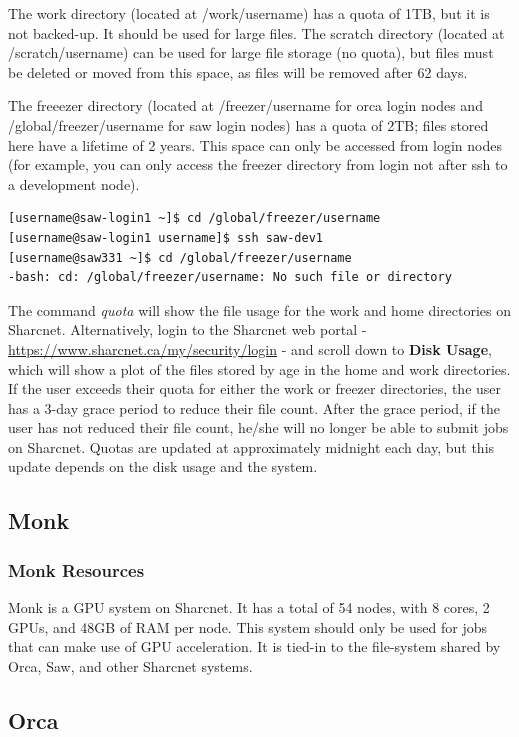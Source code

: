 \documentclass[12pt]{article}
\begin{document}
\quad The work directory (located at /work/username) has a quota of 1TB, but it is not backed-up. It should be used for large files. The scratch directory (located at /scratch/username) can be used for large file storage (no quota), but files must be deleted or moved from this space, as files will be removed after 62 days. 

\quad The freeezer directory (located at /freezer/username for orca login nodes and /global/freezer/username for saw login nodes) has a quota of 2TB; files stored here have a lifetime of 2 years. This space can only be accessed from login nodes (for example, you can only access the freezer directory from login not after ssh to a development node).

\begin{lstlisting}[numbers=none]
[username@saw-login1 ~]$ cd /global/freezer/username
[username@saw-login1 username]$ ssh saw-dev1
[username@saw331 ~]$ cd /global/freezer/username
-bash: cd: /global/freezer/username: No such file or directory
\end{lstlisting}
\quad The command \textit{quota} will show the file usage for the work and home directories on Sharcnet. Alternatively, login to the Sharcnet web portal - \url{https://www.sharcnet.ca/my/security/login} - and scroll down to \textbf{Disk Usage}, which will show a plot of the files stored by age in the home and work directories. If the user exceeds their quota for either the work or freezer directories, the user has a 3-day grace period to reduce their file count. After the grace period, if the user has not reduced their file count, he/she will no longer be able to submit jobs on Sharcnet. Quotas are updated at approximately midnight each day, but this update depends on the disk usage and the system.

\subsection{Monk}

\subsubsection{Monk Resources}
\quad Monk is a GPU system on Sharcnet. It has a total of 54 nodes, with 8 cores, 2 GPUs, and 48GB of RAM per node. This system should only be used for jobs that can make use of GPU acceleration. It is tied-in to the file-system shared by Orca, Saw, and other Sharcnet systems.

\subsection{Orca}
\end{document}
